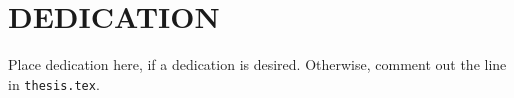 \chapter*{DEDICATION}

Place dedication here, if a dedication is desired.
Otherwise, comment out the line
\verb++
in \verb+thesis.tex+.